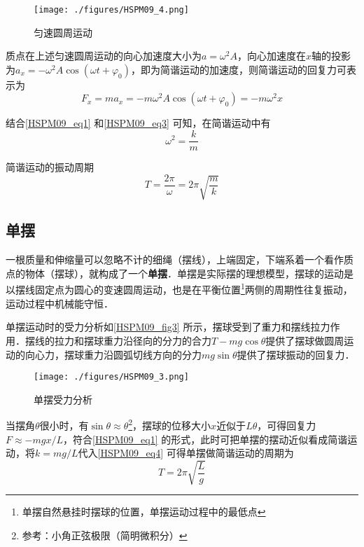 \begin{figure}[ht]
\centering
\texttt{[image: ./figures/HSPM09\_4.png]}
\caption{匀速圆周运动} \label{HSPM09_fig4}
\end{figure}

质点在上述匀速圆周运动的向心加速度大小为$a=\omega^2 A$，向心加速度在$x$轴的投影为$a_x=-\omega^2 A\cos(\omega t + \varphi_0)$，即为简谐运动的加速度，则简谐运动的回复力可表示为
\begin{equation}\label{HSPM09_eq3}
F_x=ma_x=-m\omega^2 A\cos(\omega t + \varphi_0)= -m\omega^2 x
\end{equation}

结合\autoref{HSPM09_eq1} 和\autoref{HSPM09_eq3} 可知，在简谐运动中有
\begin{equation}
\omega^2=\frac km
\end{equation}

简谐运动的振动周期
\begin{equation}\label{HSPM09_eq4}
T=\frac {2\pi}{\omega}=2\pi\sqrt{\frac mk}
\end{equation}


\subsection{单摆}

一根质量和伸缩量可以忽略不计的细绳（摆线），上端固定，下端系着一个看作质点的物体（摆球），就构成了一个\textbf{单摆}．单摆是实际摆的理想模型，摆球的运动是以摆线固定点为圆心的变速圆周运动，也是在平衡位置\footnote{单摆自然悬挂时摆球的位置，单摆运动过程中的最低点}两侧的周期性往复振动，运动过程中机械能守恒．

单摆运动时的受力分析如\autoref{HSPM09_fig3} 所示，摆球受到了重力和摆线拉力作用．摆线的拉力和摆球重力沿径向的分力的合力$T-mg\cos\theta$提供了摆球做圆周运动的向心力，摆球重力沿圆弧切线方向的分力$mg\sin\theta$提供了摆球振动的回复力．

\begin{figure}[ht]
\centering
\texttt{[image: ./figures/HSPM09\_3.png]}
\caption{单摆受力分析} \label{HSPM09_fig3}
\end{figure}

当摆角$\theta$很小时，有$\sin\theta \approx \theta$\footnote{参考：小角正弦极限（简明微积分）}，摆球的位移大小$x$近似于$L\theta$，可得回复力$F \approx -mgx/L$，符合\autoref{HSPM09_eq1} 的形式，此时可把单摆的摆动近似看成简谐运动，将$k=mg/L$代入\autoref{HSPM09_eq4} 可得单摆做简谐运动的周期为
\begin{equation}
T=2\pi\sqrt{\frac Lg}
\end{equation}
